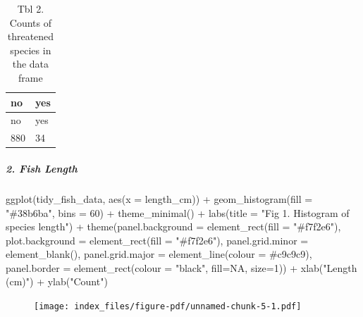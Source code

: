 \documentclass[
  letterpaper,
  DIV=11,
  numbers=noendperiod]{scrartcl}
\let\oldsubparagraph\subparagraph
\renewcommand{\subparagraph}[1]{\oldsubparagraph{#1}\mbox{}}
\newenvironment{Shaded}{\begin{snugshade}}{\end{snugshade}}
\newcommand{\AttributeTok}[1]{\textcolor[rgb]{0.40,0.45,0.13}{#1}}
\newcommand{\ConstantTok}[1]{\textcolor[rgb]{0.56,0.35,0.01}{#1}}
\newcommand{\DecValTok}[1]{\textcolor[rgb]{0.68,0.00,0.00}{#1}}
\newcommand{\FunctionTok}[1]{\textcolor[rgb]{0.28,0.35,0.67}{#1}}
\newcommand{\NormalTok}[1]{\textcolor[rgb]{0.00,0.23,0.31}{#1}}
\newcommand{\SpecialCharTok}[1]{\textcolor[rgb]{0.37,0.37,0.37}{#1}}
\newcommand{\StringTok}[1]{\textcolor[rgb]{0.13,0.47,0.30}{#1}}
\begin{document}
\begin{longtable}[]{@{}ll@{}}
\caption{Tbl 2. Counts of threatened species in the data
frame}\tabularnewline
\toprule()
no & yes \\
\midrule()
\endfirsthead
\toprule()
no & yes \\
\midrule()
\endhead
880 & 34 \\
\bottomrule()
\end{longtable}

\hypertarget{fish-length}{%
\subparagraph{2. Fish Length}\label{fish-length}}

\begin{Shaded}
\begin{Highlighting}[]
\FunctionTok{ggplot}\NormalTok{(tidy\_fish\_data, }\FunctionTok{aes}\NormalTok{(}\AttributeTok{x =}\NormalTok{ length\_cm)) }\SpecialCharTok{+}
  \FunctionTok{geom\_histogram}\NormalTok{(}\AttributeTok{fill =} \StringTok{"\#38b6ba"}\NormalTok{, }\AttributeTok{bins =} \DecValTok{60}\NormalTok{) }\SpecialCharTok{+}
  \FunctionTok{theme\_minimal}\NormalTok{() }\SpecialCharTok{+}
  \FunctionTok{labs}\NormalTok{(}\AttributeTok{title =} \StringTok{"Fig 1. Histogram of species length"}\NormalTok{) }\SpecialCharTok{+}
  \FunctionTok{theme}\NormalTok{(}\AttributeTok{panel.background =} \FunctionTok{element\_rect}\NormalTok{(}\AttributeTok{fill =} \StringTok{"\#f7f2e6"}\NormalTok{),}
        \AttributeTok{plot.background =} \FunctionTok{element\_rect}\NormalTok{(}\AttributeTok{fill =} \StringTok{"\#f7f2e6"}\NormalTok{),}
        \AttributeTok{panel.grid.minor =} \FunctionTok{element\_blank}\NormalTok{(),}
        \AttributeTok{panel.grid.major =} \FunctionTok{element\_line}\NormalTok{(}\AttributeTok{colour =} \StringTok{\textquotesingle{}\#c9c9c9\textquotesingle{}}\NormalTok{),}
        \AttributeTok{panel.border =} \FunctionTok{element\_rect}\NormalTok{(}\AttributeTok{colour =} \StringTok{"black"}\NormalTok{, }\AttributeTok{fill=}\ConstantTok{NA}\NormalTok{, }\AttributeTok{size=}\DecValTok{1}\NormalTok{)) }\SpecialCharTok{+}
  \FunctionTok{xlab}\NormalTok{(}\StringTok{"Length (cm)"}\NormalTok{) }\SpecialCharTok{+}
  \FunctionTok{ylab}\NormalTok{(}\StringTok{"Count"}\NormalTok{)}
\end{Highlighting}
\end{Shaded}

\begin{figure}[H]

{\centering \texttt{[image: index\_files/figure-pdf/unnamed-chunk-5-1.pdf]}

}

\end{figure}
\end{document}
